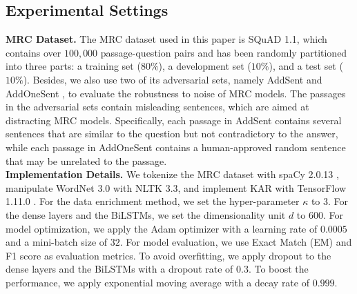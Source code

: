 \documentclass[11pt,a4paper]{article}
\begin{document}
\subsection{Experimental Settings}
\textbf{MRC Dataset.} The MRC dataset used in this paper is SQuAD 1.1, which contains over $100,000$ passage-question pairs and has been randomly partitioned into three parts: a training set ($80\%$), a development set ($10\%$), and a test set ($10\%$). Besides, we also use two of its adversarial sets, namely AddSent and AddOneSent \cite{jiarobin:2017}, to evaluate the robustness to noise of MRC models. The passages in the adversarial sets contain misleading sentences, which are aimed at distracting MRC models. Specifically, each passage in AddSent contains several sentences that are similar to the question but not contradictory to the answer, while each passage in AddOneSent contains a human-approved random sentence that may be unrelated to the passage. \\
\textbf{Implementation Details.} We tokenize the MRC dataset with spaCy 2.0.13 \cite{honnibalmatthew:2017}, manipulate WordNet 3.0 with NLTK 3.3, and implement KAR with TensorFlow 1.11.0 \cite{abadimartin:2016}. For the data enrichment method, we set the hyper-parameter $\kappa$ to $3$. For the dense layers and the BiLSTMs, we set the dimensionality unit $d$ to $600$. For model optimization, we apply the Adam \cite{kingmadiederikp:2014} optimizer with a learning rate of $0.0005$ and a mini-batch size of $32$. For model evaluation, we use Exact Match (EM) and F1 score as evaluation metrics. To avoid overfitting, we apply dropout \cite{srivastavanitish:2014} to the dense layers and the BiLSTMs with a dropout rate of $0.3$. To boost the performance, we apply exponential moving average with a decay rate of $0.999$.
\end{document}
